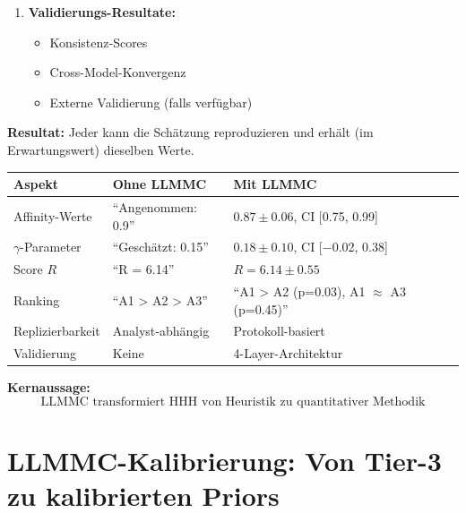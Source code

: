 \begin{tcolorbox}[colback=green!5!white, colframe=green!75!black,
    title=\textbf{Protokoll HHH-LLMMC-3: Standardisierte Replikation}]
\begin{enumerate}[nosep]
    \item \textbf{Validierungs-Resultate:}
    \begin{itemize}[nosep]
        \item Konsistenz-Scores
        \item Cross-Model-Konvergenz
        \item Externe Validierung (falls verfügbar)
    \end{itemize}
\end{enumerate}

\textbf{Resultat:} Jeder kann die Schätzung reproduzieren und erhält (im Erwartungswert) dieselben Werte.

\end{tcolorbox}

\begin{tcolorbox}[colback=blue!5!white, colframe=blue!75!black,
    title=\textbf{Zusammenfassung: Von ``sieht quantitativ aus'' zu ``ist quantitativ''}]

\renewcommand{\arraystretch}{1.3}
\begin{tabular}{@{}p{3.5cm}p{4cm}p{4cm}@{}}
\toprule
\textbf{Aspekt} & \textbf{Ohne LLMMC} & \textbf{Mit LLMMC} \\
\midrule
Affinity-Werte & ``Angenommen: 0.9'' & $0.87 \pm 0.06$, CI [0.75, 0.99] \\
$\gamma$-Parameter & ``Geschätzt: 0.15'' & $0.18 \pm 0.10$, CI [−0.02, 0.38] \\
Score $R$ & ``R = 6.14'' & $R = 6.14 \pm 0.55$ \\
Ranking & ``A1 > A2 > A3'' & ``A1 > A2 (p=0.03), A1 $\approx$ A3 (p=0.45)'' \\
Replizierbarkeit & Analyst-abhängig & Protokoll-basiert \\
Validierung & Keine & 4-Layer-Architektur \\
\bottomrule
\end{tabular}

\medskip
\textbf{Kernaussage:}
\begin{equation*}
\boxed{\text{LLMMC transformiert HHH von Heuristik zu quantitativer Methodik}}
\end{equation*}

\end{tcolorbox}


\section{LLMMC-Kalibrierung: Von Tier-3 zu kalibrierten Priors}
\label{sec:hhh-calibration}

